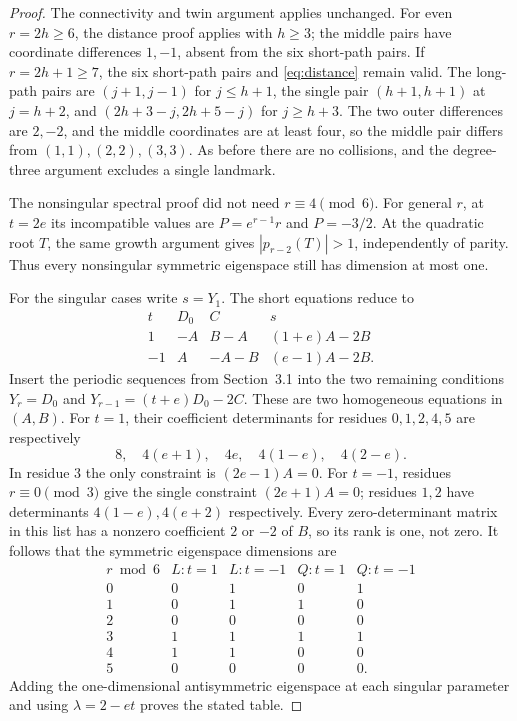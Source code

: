 \documentclass[11pt]{article}
\begin{document}
\begin{proof}
The connectivity and twin argument applies unchanged.
For even $r=2h\geq6$, the distance proof applies with $h\geq3$;
the middle pairs have coordinate differences $1,-1$, absent from
the six short-path pairs.
If $r=2h+1\geq7$, the six short-path pairs and
\eqref{eq:distance} remain valid. The long-path pairs are
$(j+1,j-1)$ for $j\leq h+1$, the single pair $(h+1,h+1)$ at $j=h+2$,
and $(2h+3-j,2h+5-j)$ for $j\geq h+3$.
The two outer differences are $2,-2$, and the middle coordinates are
at least four, so the middle pair differs from $(1,1),(2,2),(3,3)$.
As before there are no collisions, and the degree-three
argument excludes a single landmark.

The nonsingular spectral proof did not need $r\equiv4\pmod6$.
For general $r$, at $t=2e$ its incompatible values are
$P=e^{r-1}r$ and $P=-3/2$. At the quadratic root $T$, the same growth
argument gives $|p_{r-2}(T)|>1$, independently of parity. Thus every
nonsingular symmetric eigenspace still has dimension at most one.

For the singular cases write $s=Y_1$. The short equations reduce to
\[
\begin{array}{c|ccc}
 t&D_0&C&s\\\hline
 1&-A&B-A&(1+e)A-2B\\
 -1&A&-A-B&(e-1)A-2B.
\end{array}
\]
Insert the periodic sequences from Section~3.1 into the two remaining
conditions $Y_r=D_0$ and $Y_{r-1}=(t+e)D_0-2C$.
These are two homogeneous equations in $(A,B)$.
For $t=1$, their coefficient determinants for residues $0,1,2,4,5$
are respectively
\[
8,\quad4(e+1),\quad4e,\quad4(1-e),\quad4(2-e).
\]
In residue $3$ the only constraint is $(2e-1)A=0$.
For $t=-1$, residues $r\equiv0\pmod3$ give the single constraint
$(2e+1)A=0$; residues $1,2$ have determinants
$4(1-e),4(e+2)$ respectively.
Every zero-determinant matrix in this list has a nonzero coefficient
$2$ or $-2$ of $B$, so its rank is one, not zero.
It follows that the symmetric eigenspace dimensions are
\[
\begin{array}{c|cc|cc}
 r\bmod6&L:t=1&L:t=-1&Q:t=1&Q:t=-1\\\hline
 0&0&1&0&1\\
 1&0&1&1&0\\
 2&0&0&0&0\\
 3&1&1&1&1\\
 4&1&1&0&0\\
 5&0&0&0&0.
\end{array}
\]
Adding the one-dimensional antisymmetric eigenspace at each singular
parameter and using $\lambda=2-et$ proves the stated table.
\end{proof}
\end{document}
